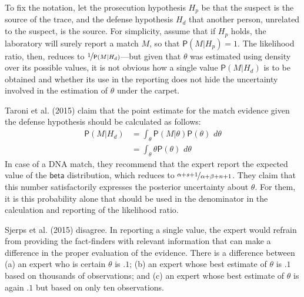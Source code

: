 \documentclass[
  10pt,
  dvipsnames,enabledeprecatedfontcommands]{scrartcl}
\newcommand{\pr}[1]{\mathsf{P}(#1)}
\newcommand{\s}[1]{\mbox{$\mathsf{#1}$}}
\begin{document}
To fix the notation, let the prosecution hypothesis \(H_p\) be that the
suspect is the source of the trace, and the defense hypothesis \(H_d\)
that another person, unrelated to the suspect, is the source. For
simplicity, assume that if \(H_p\) holds, the laboratory will surely
report a match \(M\), so that \(\pr{M\vert H_p}=1\). The likelihood
ratio, then, reduces to \(\nicefrac{1}{\pr{M \vert H_d}}\)---but given
that \(\theta\) was estimated using density over its possible values, it
is not obvious how a single value \(\pr{M \vert H_d}\) is to be obtained
and whether its use in the reporting does not hide the uncertainty
involved in the estimation of \(\theta\) under the carpet.

Taroni et al. (2015) claim that the point estimate for the match
evidence given the defense hypothesis should be calculated as follows:
\begin{align*}\pr{M \vert H_d} & = \int_{\theta} \pr{M\vert \theta} \pr{\theta}\,\, d\theta \\
& =  \int_\theta  \theta \pr{\theta}\,\, d\theta
\end{align*} In case of a DNA match, they recommend that the expert
report the expected value of the \(\s{beta}\) distribution, which
reduces to \(\nicefrac{\alpha + s + 1}{\alpha + \beta +n + 1}\). They
claim that this number satisfactorily expresses the posterior
uncertainty about \(\theta\). For them, it is this probability alone
that should be used in the denominator in the calculation and reporting
of the likelihood ratio.

Sjerps et al. (2015) disagree. In reporting a single value, the expert
would refrain from providing the fact-finders with relevant information
that can make a difference in the proper evaluation of the evidence.
There is a difference between (a) an expert who is certain \(\theta\) is
\(.1\); (b) an expert whose best estimate of \(\theta\) is \(.1\) based
on thousands of observations; and (c) an expert whose best estimate of
\(\theta\) is again \(.1\) but based on only ten observations.
\end{document}
